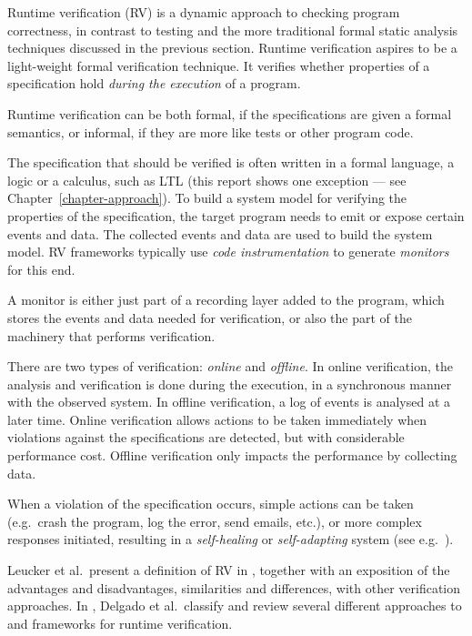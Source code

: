 Runtime verification (RV) \cite{leucker09abriefaccount,delgado04taxonomy} is a
dynamic approach to checking program correctness, in contrast to testing and
the more traditional formal static analysis techniques discussed in the
previous section. Runtime verification aspires to be a light-weight formal
verification technique. It verifies whether properties of a
specification hold \textit{during the execution} of a program.

Runtime verification can be both formal, if the specifications are given a
formal semantics, or informal, if they are more like tests or other program
code.

The specification that should be verified is often written in a formal
language, a logic or a calculus, such as LTL \cite{pnueli77} (this report shows
one exception --- see Chapter~\ref{chapter-approach}). To build a system model
for verifying the properties of the specification, the target program needs to
emit or expose certain events and data. The collected events and data are used
to build the system model. RV frameworks typically use \textit{code
instrumentation} to generate \textit{monitors} for this end.

A monitor is either just part of a recording layer added to the program, which
stores the events and data needed for verification, or also the part of the
machinery that performs verification.

There are two types of verification: \emph{online} and \emph{offline}. In
online verification, the analysis and verification is done during the
execution, in a synchronous manner with the observed system. In offline
verification, a log of events is analysed at a later time. Online verification
allows actions to be taken immediately when violations against the
specifications are detected, but with considerable performance cost. Offline
verification only impacts the performance by collecting data.

When a violation of the specification occurs, simple actions can be taken
(e.g.\ crash the program, log the error, send emails, etc.), or more complex
responses initiated, resulting in a \textit{self-healing} or
\textit{self-adapting} system (see e.g.\ \cite{huebscher08survey}).

Leucker et al.\ present a definition of RV in \cite{leucker09abriefaccount},
together with an exposition of the advantages and disadvantages, similarities
and differences, with other verification approaches. In
\cite{delgado04taxonomy}, Delgado et al.\ classify and review several different
approaches to and frameworks for runtime verification.

